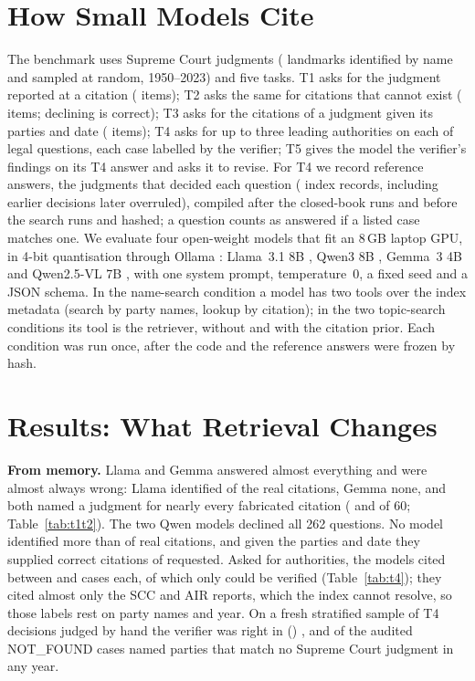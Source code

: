 

\section{How Small Models Cite}
\label{sec:setup}
The benchmark uses \NumJudgments{} Supreme Court judgments (\NumLandmark{} landmarks identified by name and \NumRandom{} sampled at random, 1950--2023) and five tasks. T1 asks for the judgment reported at a citation (\NumTOne{} items); T2 asks the same for citations that cannot exist (\NumTTwo{} items; declining is correct); T3 asks for the citations of a judgment given its parties and date (\NumTThree{} items); T4 asks for up to three leading authorities on each of \NumTopics{} legal questions, each case labelled by the verifier; T5 gives the model the verifier's findings on its T4 answer and asks it to revise. For T4 we record reference answers, the judgments that decided each question (\NumRefJudgments{} index records, including earlier decisions later overruled), compiled after the closed-book runs and before the search runs and hashed; a question counts as answered if a listed case matches one. We evaluate four open-weight models that fit an 8\,GB laptop GPU, in 4-bit quantisation through Ollama \cite{ollama}: Llama~3.1 8B \cite{llama3}, Qwen3 8B \cite{qwen3}, Gemma~3 4B \cite{gemma3} and Qwen2.5-VL 7B \cite{qwen25vl}, with one system prompt, temperature~0, a fixed seed and a JSON schema. In the name-search condition a model has two tools over the index metadata (search by party names, lookup by citation); in the two topic-search conditions its tool is the retriever, without and with the citation prior. Each condition was run once, after the code and the reference answers were frozen by hash.



\section{Results: What Retrieval Changes}
\label{sec:results}
\textbf{From memory.} Llama and Gemma answered almost everything and were almost always wrong: Llama identified \TOneCorrectLlama{} of the \TOneN{} real citations, Gemma none, and both named a judgment for nearly every fabricated citation (\TTwoNamedLlama{} and \TTwoNamedGemma{} of 60; Table~\ref{tab:t1t2}). The two Qwen models declined all 262 questions. No model identified more than \BestTOneCorrect{} of \TOneN{} real citations, and given the parties and date they supplied \TThreeCorrectAll{} correct citations of \TThreeAskedAll{} requested. Asked for authorities, the models cited between \TFourCasesMin{} and \TFourCasesMax{} cases each, of which only \TFourVerifiedRange{} could be verified (Table~\ref{tab:t4}); they cited almost only the SCC and AIR reports, which the index cannot resolve, so those labels rest on party names and year. On a fresh stratified sample of \AuditN{} T4 decisions judged by hand the verifier was right in \AuditCorrect{} (\AuditPct) \label{sec:audit}, and of the \AuditNFN{} audited NOT\_FOUND cases \AuditNFFab{} named parties that match no Supreme Court judgment in any year.

